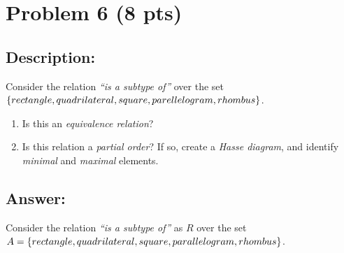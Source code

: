 \newpage

\section{Problem 6 (8 pts)}
\subsection{Description:}

\noindent Consider the relation \textit{``is a subtype of''} over the set $\{ rectangle, quadrilateral, square, parellelogram,\\rhombus\}$.

\begin{enumerate}

\item Is this an \textit{equivalence relation}?

\item Is this relation a \textit{partial order}? If so, create a \textit{Hasse diagram}, and identify \textit{minimal} and \textit{maximal} elements.

\end{enumerate}

\subsection{Answer:}

Consider the relation \textit{``is a subtype of''} as $R$ over the set $A = \{ rectangle, quadrilateral, square, \\parallelogram,rhombus\}$.
\\

